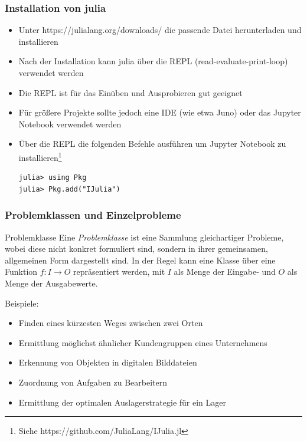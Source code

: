 \begin{frame}[fragile]
\frametitle{Installation von julia}
\begin{itemize}
\item Unter https://julialang.org/downloads/ die passende Datei herunterladen und installieren
\pause
\item Nach der Installation kann julia über die REPL (read-evaluate-print-loop) verwendet werden
\pause
\item Die REPL ist für das Einüben und Ausprobieren gut geeignet
\pause
\item Für größere Projekte sollte jedoch eine IDE (wie etwa Juno) oder das Jupyter Notebook verwendet werden
\pause
\item Über die REPL die folgenden Befehle ausführen um Jupyter Notebook zu installieren\footnote{Siehe https://github.com/JuliaLang/IJulia.jl}
\begin{verbatim}
julia> using Pkg
julia> Pkg.add("IJulia")
\end{verbatim}
\end{itemize}
\end{frame}
\begin{frame}
\frametitle{Problemklassen und Einzelprobleme}
\begin{block}{Problemklasse}
Eine \textit{Problemklasse} ist eine Sammlung gleichartiger Probleme, wobei diese nicht konkret formuliert sind, sondern in ihrer gemeinsamen, allgemeinen Form dargestellt sind. In der Regel kann eine Klasse über eine Funktion $f:I \rightarrow O$ repräsentiert werden, mit $I$ als Menge der Eingabe- und $O$ als Menge der Ausgabewerte.
\end{block}
Beispiele:\pause
\begin{itemize}
\item Finden eines kürzesten Weges zwischen zwei Orten\pause
\item Ermittlung möglichst ähnlicher Kundengruppen eines Unternehmens\pause
\item Erkennung von Objekten in digitalen Bilddateien\pause
\item Zuordnung von Aufgaben zu Bearbeitern\pause
\item Ermittlung der optimalen Auslagerstrategie für ein Lager
\end{itemize}
\end{frame}
